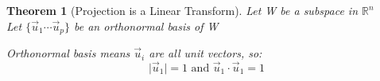 \documentclass{article}
\theoremstyle{break}
\newtheorem*{theorem}{Theorem}
\begin{document}
\begin{theorem}[Projection is a Linear Transform]
Let W be a subspace in $\mathbb{R}^n$ \\
Let $\{\vec{u}_1 \dotsm \vec{u}_p \}$ be an orthonormal basis of W

\medskip

Orthonormal basis means $\vec{u}_i$ are all unit vectors, so:
\begin{equation}
    \lvert\vec{u}_1\rvert = 1\text{ and } \vec{u}_1 \cdot \vec{u}_1 = 1
\end{equation}

\end{theorem}
\end{document}
